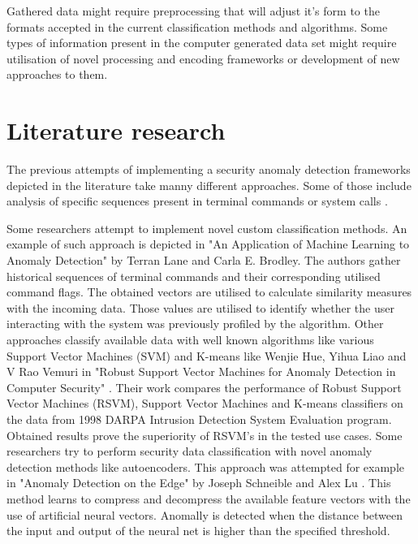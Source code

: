 \documentclass[a4paper,twoside,12pt]{book}
\begin{document}
Gathered data might require preprocessing that will adjust it's form to the formats accepted in the
current classification methods and algorithms. Some types of information present in the computer 
generated data set might require utilisation of novel processing and encoding frameworks or 
development of new approaches to them.  



\section{Literature research}

The previous attempts of implementing a security anomaly detection frameworks depicted in the 
literature take manny different approaches. Some of those include analysis of specific sequences
present in terminal commands \cite{bib:lane1997application} or system calls \cite{bib:forest}. 

Some researchers attempt to implement novel custom classification methods. An example of such 
approach is depicted in "An Application of Machine Learning to Anomaly Detection" by Terran Lane 
and Carla E. Brodley\cite{bib:lane1997application}. The authors gather historical sequences of
terminal commands and their corresponding utilised command flags. The obtained vectors are utilised
to calculate similarity measures with the incoming data. Those values are utilised to identify 
whether the user interacting with the system was previously profiled by the algorithm.
Other approaches classify available data with well known algorithms like various Support Vector 
Machines (SVM) and K-means like Wenjie Hue, Yihua Liao and V Rao Vemuri in "Robust Support Vector 
Machines for Anomaly Detection in Computer Security" \cite{bib:rsvm}. Their work compares the 
performance of Robust Support Vector Machines (RSVM), Support Vector Machines and K-means classifiers
on the data from 1998 DARPA Intrusion Detection System Evaluation program. Obtained results
prove the superiority of RSVM's in the tested use cases. Some researchers try to perform security
data classification with novel anomaly detection methods like autoencoders. This approach was
attempted for example in "Anomaly Detection on the Edge" by Joseph Schneible and Alex Lu
\cite{bib:autoencoderDist}. This method learns to compress and decompress the available feature 
vectors with the use of artificial neural vectors. Anomally is detected when the distance 
between the input and output of the neural net is higher than the specified threshold.
\end{document}
